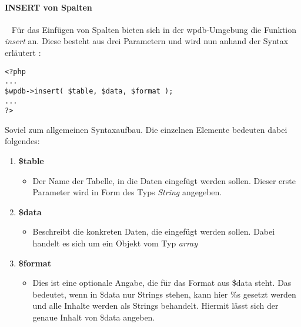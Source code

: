 \paragraph{INSERT von Spalten}\label{insert}\ \newline
Für das Einfügen von Spalten bieten sich in der wpdb-Umgebung die Funktion \emph{insert} an. Diese besteht aus drei Parametern und wird nun anhand der Syntax erläutert :
\begin{lstlisting}
<?php 
...
$wpdb->insert( $table, $data, $format ); 
...
?> 
\end{lstlisting}
Soviel zum allgemeinen Syntaxaufbau. Die einzelnen Elemente bedeuten dabei folgendes: 
\begin{enumerate}
	\item {\bf \$table}
	\begin{itemize} 
		\item Der Name der Tabelle, in die Daten eingefügt werden sollen. Dieser erste Parameter wird in Form des Typs \emph{String} angegeben.
	\end{itemize}
	\item {\bf \$data}
	\begin{itemize}
		\item Beschreibt die konkreten Daten, die eingefügt werden sollen. Dabei handelt es sich um ein Objekt vom Typ \emph{array}	
	\end{itemize}
	\item {\bf \$format}
	\begin{itemize}
		\item Dies ist eine optionale Angabe, die für  das Format aus \$data steht. Das bedeutet, wenn in \$data nur Strings stehen, kann hier \%s gesetzt werden und alle Inhalte werden als Strings behandelt. Hiermit lässt sich der genaue Inhalt von \$data angeben.
	\end{itemize}
\end{enumerate}
